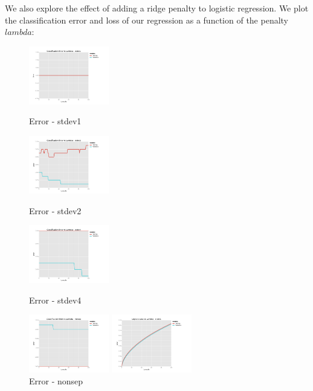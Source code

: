 \documentclass[10pt]{article}
\begin{document}
We also explore the effect of adding a ridge penalty to logistic regression. We plot the classification error and loss of our regression as a function of the penalty $lambda$:

\begin{figure}[ht]
	\centering
	\begin{minipage}[b]{.24\linewidth}
		\includegraphics[width=1\linewidth, height=1in]{CErr_lambda_stdev1.png}
		\caption*{Error - stdev1}
	\end{minipage}
	\begin{minipage}[b]{.24\linewidth}
		\includegraphics[width=1\linewidth, height=1in]{CErr_lambda_stdev2.png}
		\caption*{Error - stdev2}
	\end{minipage}
	\begin{minipage}[b]{.24\linewidth}
		\includegraphics[width=1\linewidth, height=1in]{CErr_lambda_stdev4.png}
		\caption*{Error - stdev4}
	\end{minipage}
	\begin{minipage}[b]{.24\linewidth}
		\includegraphics[width=1\linewidth, height=1in]{CErr_lambda_nonsep.png}
		\caption*{Error - nonsep}
	\end{minipage}
		\begin{minipage}[b]{.24\linewidth}
		\includegraphics[width=1\linewidth, height=1in]{Loss_lambda_stdev1.png}

\end{minipage}
\end{figure}
\end{document}
